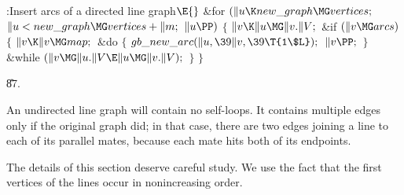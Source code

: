 \B{}:Insert arcs of a directed line graph\X${}\E{}$\6
\&{for} ${}(\|u\K\\{new\_graph}\MG\\{vertices};{}$ ${}\|u<\\{new\_graph}\MG%
\\{vertices}+\|m;{}$ ${}\|u\PP){}$\5
${}\{{}$\1\6
${}\|v\K\|u\MG\|v.\|V;{}$\6
\&{if} ${}(\|v\MG\\{arcs}){}$\5
${}\{{}$\1\6
${}\|v\K\|v\MG\\{map};{}$\6
\&{do}\5
${}\{{}$\1\6
${}\\{gb\_new\_arc}(\|u,\39\|v,\39\T{1\$L});{}$\6
${}\|v\PP;{}$\6
\4${}\}{}$\5
\2\5
\&{while} ${}(\|v\MG\|u.\|V\E\|u\MG\|v.\|V);{}$\6
\4${}\}{}$\2\6
\4${}\}{}$\2\par
\U87.\fi

An undirected line graph will contain no self-loops. It contains
multiple edges only if the original graph did; in that case, there
are two edges joining a line to each of its parallel mates, because
each mate hits both of its endpoints.

The details of this section deserve careful study.  We use the
fact that the first vertices of the lines occur in nonincreasing order.

